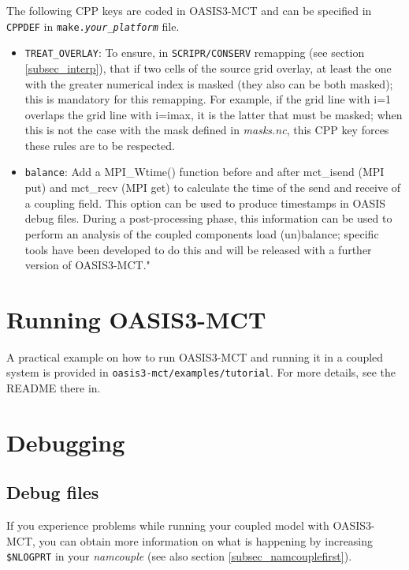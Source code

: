 The following CPP keys are coded in OASIS3-MCT and
can be specified in {\tt CPPDEF} in {\tt make.{\it your\_platform}} file.

\begin{itemize}

\item {\tt TREAT\_OVERLAY}: To ensure, in {\tt SCRIPR/CONSERV} remapping (see section
  \ref{subsec_interp}), that if two cells of the source grid overlay,
  at least the one with the greater numerical index is masked (they
  also can be both masked); this is mandatory for this remapping. For
  example, if the grid line with i=1 overlaps the grid line with
  i=imax, it is the latter that must be masked; when this is not the
  case with the mask defined in {\it masks.nc}, this CPP key forces
  these rules are to be respected.

\item {\tt balance}: Add a MPI\_Wtime() function before and after mct\_isend (MPI put)
   and mct\_recv (MPI get) to calculate the time of the send and receive of a coupling field. This option can be used to produce timestamps in OASIS debug files. During a post-processing phase, this information can be used to perform
an analysis of the coupled components load (un)balance; specific tools have
been developed to do this and will be released with a further version of
OASIS3-MCT."

\end{itemize}

\section{Running OASIS3-MCT}
\label{subsec_running}

A practical example on how to run OASIS3-MCT and running it in a
coupled system is provided in {\tt oasis3-mct/examples/tutorial}. For
more details, see the README there in.

\section{Debugging}
\label{subsec_debug}

\subsection{Debug files}
If you experience problems while running your coupled model with
OASIS3-MCT, you can obtain more information on what is happening by increasing {\tt \$NLOGPRT} 
in your {\it namcouple} (see also section \ref{subsec_namcouplefirst}).

